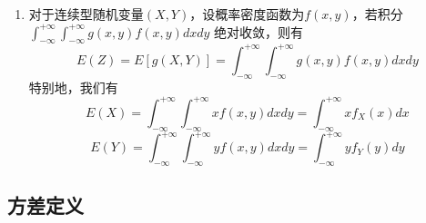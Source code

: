 \documentclass[12pt,a4paper,UTF8]{book}
\begin{document}
\begin{enumerate}
\begin{enumerate}
\item 对于连续型随机变量$\left(X,Y\right)$，设概率密度函数为$f\left(x,y\right)$，若积分$\int_{-\infty}^{+\infty}\int_{-\infty}^{+\infty}g\left(x,y\right)f\left(x,y\right)dxdy$ 绝对收敛，则有
\[E\left(Z\right)=E\left[g\left(X,Y\right)\right]=\int_{-\infty}^{+\infty}\int_{-\infty}^{+\infty}g\left(x,y\right)f\left(x,y\right)dxdy\]
特别地，我们有
\[E\left(X\right)=\int_{-\infty}^{+\infty}\int_{-\infty}^{+\infty}xf\left(x,y\right)dxdy=\int_{-\infty}^{+\infty}xf_X\left(x\right)dx\]
\[E\left(Y\right)=\int_{-\infty}^{+\infty}\int_{-\infty}^{+\infty}yf\left(x,y\right)dxdy=\int_{-\infty}^{+\infty}yf_Y\left(y\right)dy\]
\end{enumerate}
\end{enumerate}

\subsection{方差定义}
\end{document}
